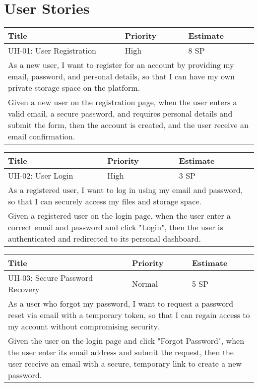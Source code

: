\section{User Stories}

\begin{tabular}{|p{4cm}|p{5cm}|p{5cm}|}
    \hline
    \textbf{Title} & \textbf{Priority} & \textbf{Estimate} \\
    \hline
    UH-01: User Registration & High & 8 SP \\
    \hline
    \multicolumn{3}{|p{14cm}|}{As a new user, I want to register for an account by providing my email, password, and personal details, so that I can have my own private storage space on the platform.} \\
    \hline
    \multicolumn{3}{|p{14cm}|}{Given a new user on the registration page, when the user enters a valid email, a secure password, and requires personal details and submit the form, then the account is created, and the user receive an email confirmation.} \\
    \hline
\end{tabular}

\vspace{5mm}
\begin{tabular}{|p{4cm}|p{5cm}|p{5cm}|}
    \hline
    \textbf{Title} & \textbf{Priority} & \textbf{Estimate} \\
    \hline
    UH-02: User Login & High & 3 SP \\
    \hline
    \multicolumn{3}{|p{14cm}|}{As a registered user, I want to log in using my email and password, so that I can securely access my files and storage space.} \\
    \hline
    \multicolumn{3}{|p{14cm}|}{Given a registered user on the login page, when the user enter a correct email and password and click "Login", then the user is authenticated and redirected to its personal dashboard.} \\
    \hline
\end{tabular}

\vspace{5mm}
\begin{tabular}{|p{4cm}|p{5cm}|p{5cm}|}
    \hline
    \textbf{Title} & \textbf{Priority} & \textbf{Estimate} \\
    \hline
    UH-03: Secure Password Recovery & Normal & 5 SP \\
    \hline
    \multicolumn{3}{|p{14cm}|}{As a user who forgot my password, I want to request a password reset via email with a temporary token, so that I can regain access to my account without compromising security.} \\
    \hline
    \multicolumn{3}{|p{14cm}|}{Given the user on the login page and click "Forgot Password", when  the user enter its email address and submit the request, then the user receive an email with a secure, temporary link to create a new password.} \\
    \hline
\end{tabular}

